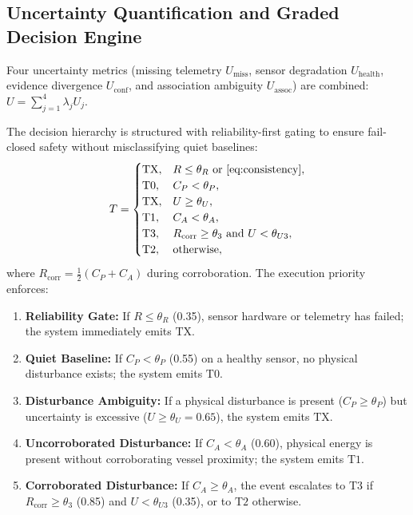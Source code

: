 \documentclass[conference]{IEEEtran}
\newcommand{\dstate}[1]{\ensuremath{\mathrm{#1}}}
\begin{document}
\subsection{Uncertainty Quantification and Graded Decision Engine}
\label{sec:decision-engine}

Four uncertainty metrics (missing telemetry $U_{\mathrm{miss}}$, sensor degradation
$U_{\mathrm{health}}$, evidence divergence $U_{\mathrm{conf}}$, and association
ambiguity $U_{\mathrm{assoc}}$) are combined: $U = \sum_{j=1}^4 \lambda_j U_j$.

The decision hierarchy is structured with reliability-first gating to ensure
fail-closed safety without misclassifying quiet baselines:
\begin{equation}
T =
\begin{cases}
\dstate{TX}, & R \leq \theta_R \ \text{or}\ \text{\eqref{eq:consistency}}, \\
\dstate{T0}, & C_P < \theta_P, \\
\dstate{TX}, & U \geq \theta_U, \\
\dstate{T1}, & C_A < \theta_A, \\
\dstate{T3}, & R_{\mathrm{corr}} \geq \theta_3 \ \text{and}\ U < \theta_{U3}, \\
\dstate{T2}, & \text{otherwise},
\end{cases}
\label{eq:decision}
\end{equation}
where $R_{\mathrm{corr}} = \frac{1}{2}(C_P + C_A)$ during corroboration.
The execution priority enforces:
\begin{enumerate}
\item \textbf{Reliability Gate:} If $R \leq \theta_R$ (0.35), sensor hardware or
telemetry has failed; the system immediately emits \dstate{TX}.
\item \textbf{Quiet Baseline:} If $C_P < \theta_P$ (0.55) on a healthy sensor,
no physical disturbance exists; the system emits \dstate{T0}.
\item \textbf{Disturbance Ambiguity:} If a physical disturbance is present
($C_P \geq \theta_P$) but uncertainty is excessive ($U \geq \theta_U = 0.65$),
the system emits \dstate{TX}.
\item \textbf{Uncorroborated Disturbance:} If $C_A < \theta_A$ (0.60), physical
energy is present without corroborating vessel proximity; the system emits \dstate{T1}.
\item \textbf{Corroborated Disturbance:} If $C_A \geq \theta_A$, the event
escalates to \dstate{T3} if $R_{\mathrm{corr}} \geq \theta_3$ (0.85) and
$U < \theta_{U3}$ (0.35), or to \dstate{T2} otherwise.
\end{enumerate}
\end{document}
